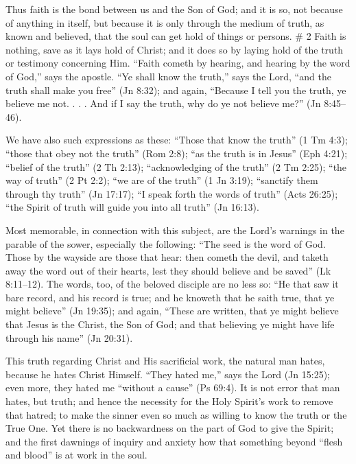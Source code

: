 \documentclass[
]{book}
\begin{document}
Thus faith is the bond between us and the Son of God; and it is so, not because of anything in itself, but because it is only through the medium of truth, as known and believed, that the soul can get hold of things or persons.
\# 2
Faith is nothing, save as it lays hold of Christ; and it does so by laying hold of the truth or testimony concerning Him. ``Faith cometh by hearing, and hearing by the word of God,'' says the apostle. ``Ye shall know the truth,'' says the Lord, ``and the truth shall make you free'' (Jn 8:32); and again, ``Because I tell you the truth, ye believe me not. . . . And if I say the truth, why do ye not believe me?'' (Jn 8:45--46).

We have also such expressions as these: ``Those that know the truth'' (1 Tm 4:3); ``those that obey not the truth'' (Rom 2:8); ``as the truth is in Jesus'' (Eph 4:21); ``belief of the truth'' (2 Th 2:13); ``acknowledging of the truth'' (2 Tm 2:25); ``the way of truth'' (2 Pt 2:2); ``we are of the truth'' (1 Jn 3:19); ``sanctify them through thy truth'' (Jn 17:17); ``I speak forth the words of truth'' (Acts 26:25); ``the Spirit of truth will guide you into all truth'' (Jn 16:13).

Most memorable, in connection with this subject, are the Lord's warnings in the parable of the sower, especially the following: ``The seed is the word of God. Those by the wayside are those that hear: then cometh the devil, and taketh away the word out of their hearts, lest they should believe and be saved'' (Lk 8:11--12). The words, too, of the beloved disciple are no less so: ``He that saw it bare record, and his record is true; and he knoweth that he saith true, that ye might believe'' (Jn 19:35); and again, ``These are written, that ye might believe that Jesus is the Christ, the Son of God; and that believing ye might have life through his name'' (Jn 20:31).

This truth regarding Christ and His sacrificial work, the natural man hates, because he hates Christ Himself. ``They hated me,'' says the Lord (Jn 15:25); even more, they hated me ``without a cause'' (Ps 69:4). It is not error that man hates, but truth; and hence the necessity for the Holy Spirit's work to remove that hatred; to make the sinner even so much as willing to know the truth or the True One. Yet there is no backwardness on the part of God to give the Spirit; and the first dawnings of inquiry and anxiety how that something beyond ``flesh and blood'' is at work in the soul.
\end{document}
